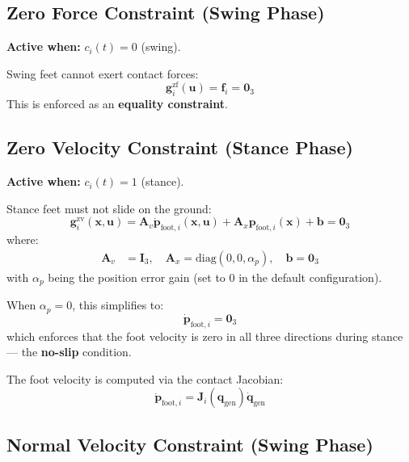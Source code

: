 \documentclass[11pt,a4paper]{article}
\begin{document}
\subsection{Zero Force Constraint (Swing Phase)}
\label{sec:zero_force}

\textbf{Active when:} $c_i(t) = 0$ (swing).

Swing feet cannot exert contact forces:
\begin{equation}
	\boxed{
		\bm{g}_i^{\text{zf}}(\bm{u}) = \bm{f}_i = \bm{0}_3
	}
\end{equation}
This is enforced as an \textbf{equality constraint}.

\subsection{Zero Velocity Constraint (Stance Phase)}
\label{sec:zero_vel}

\textbf{Active when:} $c_i(t) = 1$ (stance).

Stance feet must not slide on the ground:
\begin{equation}
	\boxed{
		\bm{g}_i^{\text{zv}}(\bm{x}, \bm{u}) = \bm{A}_v \dot{\bm{p}}_{\text{foot},i}(\bm{x}, \bm{u}) + \bm{A}_x \bm{p}_{\text{foot},i}(\bm{x}) + \bm{b} = \bm{0}_3
	}
\end{equation}
where:
\begin{align}
	\bm{A}_v & = \bm{I}_3, \quad \bm{A}_x = \text{diag}(0, 0, \alpha_p), \quad \bm{b} = \bm{0}_3
\end{align}
with $\alpha_p$ being the position error gain (set to 0 in the default configuration).

When $\alpha_p = 0$, this simplifies to:
\begin{equation}
	\dot{\bm{p}}_{\text{foot},i} = \bm{0}_3
\end{equation}
which enforces that the foot velocity is zero in all three directions during stance --- the \textbf{no-slip} condition.

The foot velocity is computed via the contact Jacobian:
\begin{equation}
	\dot{\bm{p}}_{\text{foot},i} = \bm{J}_i(\bm{q}_{\text{gen}}) \dot{\bm{q}}_{\text{gen}}
\end{equation}

\subsection{Normal Velocity Constraint (Swing Phase)}
\label{sec:normal_vel}
\end{document}
